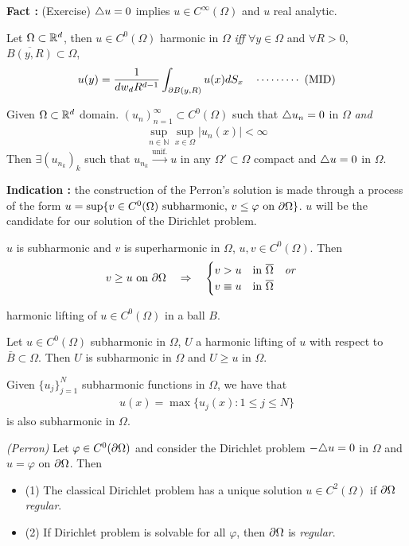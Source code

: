 \documentclass[10pt,a4paper]{article}
\renewenvironment{i}
{\begin{itemize} 
	}%
	{\end{itemize}
}
\begin{document}
\textbf{Fact :} (Exercise) $\triangle u= 0$ implies $u\in C^{\infty}(\Omega)$ and $u$ real analytic.
\s

 Let $\Omega \subset \mathbb{R}^d$, then $u\in C^0(\Omega)$ harmonic in $\Omega$ \emph{iff} $\forall y\in \Omega$ and $\forall R>0$, $\overline{B(y, R)}\subset \Omega$,
\begin{align*}
u(y) = \frac{1}{dw_d R^{d-1}} \int_{\partial B(y, R)}u(x) dS_x \quad \cdots\cdots\cdots\,\,(\text{MID})
\end{align*}
\s

 Given $\Omega \subset \mathbb{R}^d$ domain. $(u_n)_{n=1}^{\infty} \subset C^0(\Omega)$ such that $\triangle u_n =0$ in $\Omega$ \emph{and}
\begin{align*}
\sup_{n\in \mathbb{N}} \sup_{x\in \Omega} |u_n(x)| < \infty
\end{align*}
Then $\exists (u_{n_k})_k$ such that $u_{n_k} \xrightarrow{\text{unif.}} u$ in any $\Omega' \subset \Omega$ compact and $\triangle u=0$ in $\Omega$.
\s

\textbf{Indication :} the construction of the Perron's solution is made through a process of the form $u = \sup \{ v\in C^0(\Omega) \text{ subharmonic, } v\leq \varphi \text{ on } \partial \Omega \}$. $u$ will be the candidate for our solution of the Dirichlet problem.
\s

 $u$ is subharmonic and $v$ is superharmonic in $\Omega$, $u, v\in C^0(\Omega)$. Then
\begin{align*}
v\geq u \text{ on } \partial \Omega \quad \Rightarrow \quad \begin{cases}
v > u \quad \text{in } \overline{\Omega} \quad \emph{or} \\
v \equiv u \quad \text{in } \overline{\Omega}
\end{cases}
\end{align*}
\s

 harmonic lifting of $u\in C^0(\Omega)$ in a ball $B$.
\s

 Let $u\in C^0(\Omega)$ subharmonic in $\Omega$, $U$ a harmonic lifting of $u$ with respect to $\bar{B} \subset \Omega$. Then $U$ is subharmonic in $\Omega$ and $U\geq u$ in $\Omega$.
\s

 Given $\{u_j\}_{j=1}^N$ subharmonic functions in $\Omega$, we have that 
\begin{align*}
u(x) = \max \{u_j(x) : 1\leq j\leq N\}
\end{align*}
is also subharmonic in $\Omega$.
\s

\thm \emph{(Perron)} Let $\varphi \in C^0 (\partial \Omega)$ and consider the Dirichlet problem $-\triangle u =0$ in $\Omega$ and $u=\varphi$ on $\partial \Omega$. Then
\begin{i}
\item[(1)] The classical Dirichlet problem has a unique solution $u\in C^2(\Omega)$ if $\partial \Omega$ \emph{regular}.
\item[(2)] If Dirichlet problem is solvable for all $\varphi$, then $\partial \Omega$ is \emph{regular}.
\end{i}
\end{document}
